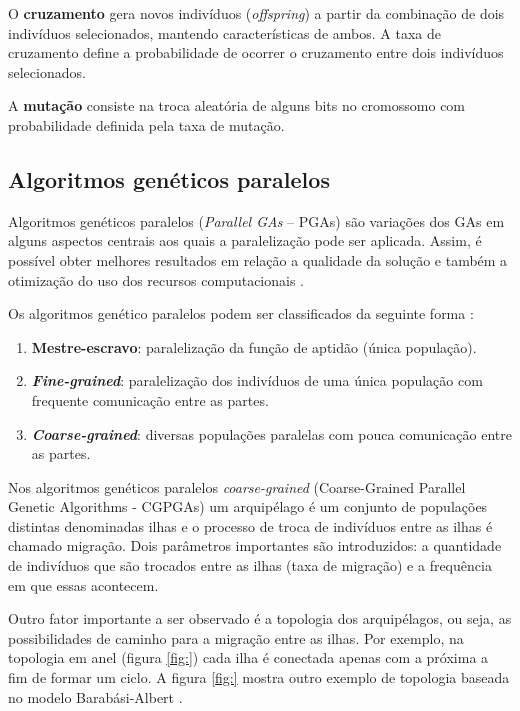 O \textbf{cruzamento} gera novos indivíduos (\textit{offspring}) a partir da combinação de dois indivíduos selecionados, mantendo características de ambos. A taxa de cruzamento define a probabilidade de ocorrer o cruzamento entre dois indivíduos selecionados.

A \textbf{mutação} consiste na troca aleatória de alguns bits no cromossomo com probabilidade definida pela taxa de mutação.

\subsection{Algoritmos genéticos paralelos}

Algoritmos genéticos paralelos (\textit{Parallel GAs} -- PGAs) \cite{shonkwiler1993parallel} são variações dos GAs em alguns aspectos centrais aos quais a paralelização pode ser aplicada. Assim, é possível obter melhores resultados em relação a qualidade da solução e também a otimização do uso dos recursos computacionais \cite{erik2012geneticos}.

Os algoritmos genético paralelos podem ser classificados da seguinte forma \cite{cantupaz1998asurvey}:

\begin{enumerate}
    \item \textbf{Mestre-escravo}: paralelização da função de aptidão (única população).
    \item \textbf{\textit{Fine-grained}}: paralelização dos indivíduos de uma única população com frequente comunicação entre as partes.
    \item \textbf{\textit{Coarse-grained}}: diversas populações paralelas com pouca comunicação entre as partes.
\end{enumerate}

Nos algoritmos genéticos paralelos \textit{coarse-grained} (Coarse-Grained Parallel Genetic Algorithms - CGPGAs) um arquipélago é um conjunto de populações distintas denominadas ilhas e o processo de troca de indivíduos entre as ilhas é chamado migração. Dois parâmetros importantes são introduzidos: a quantidade de indivíduos que são trocados entre as ilhas (taxa de migração) e a frequência em que essas acontecem.

Outro fator importante a ser observado é a topologia dos arquipélagos, ou seja, as possibilidades de caminho para a migração entre as ilhas. Por exemplo, na topologia em anel (figura \ref{fig:}) cada ilha é conectada apenas com a próxima a fim de formar um ciclo. A figura \ref{fig:} mostra outro exemplo de topologia baseada no modelo Barabási-Albert \cite{albert2002statistical}.

